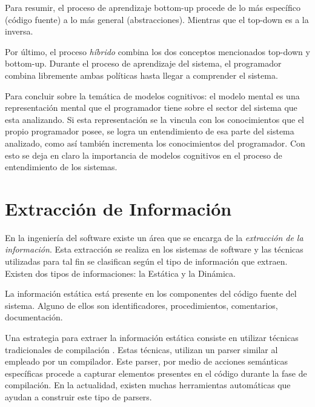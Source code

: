 \documentclass[a4paper,12pt]{report}
\begin{document}

Para resumir, el proceso de aprendizaje bottom-up procede de lo más específico (código fuente) a lo más general (abstracciones). Mientras que el top-down es a la inversa.

Por último, el proceso \textit{híbrido} combina los dos conceptos mencionados top-down y bottom-up. Durante el proceso de aprendizaje del sistema, el programador combina libremente ambas políticas hasta llegar a comprender el sistema.

Para concluir sobre la temática de modelos cognitivos: el modelo mental es una representación mental que el programador tiene sobre el sector del sistema que esta analizando. Si esta representación se la vincula con los conocimientos que el propio programador posee, se logra un entendimiento de esa parte del sistema analizado, como así también incrementa los conocimientos del programador. Con esto se deja en claro la importancia de modelos cognitivos en el proceso de entendimiento de los sistemas.%

\section{Extracción de Información}

En la ingeniería del software existe un área que se encarga de la \textit{extracción de la información}. Esta extracción se realiza en los sistemas de software y las técnicas utilizadas para tal fin se clasifican según el tipo de información que extraen. Existen dos tipos de informaciones: la Estática y la Dinámica.

La información estática está presente en los componentes del código fuente del sistema. Alguno de ellos son identificadores, procedimientos, comentarios, documentación.

Una estrategia para extraer la información estática consiste en utilizar técnicas tradicionales de compilación \cite{AHUL06}. Estas 
técnicas, utilizan un parser similar al empleado por un compilador. Este parser, por medio de acciones semánticas específicas procede a capturar elementos presentes en el código durante la fase de compilación. En la actualidad, existen muchas herramientas automáticas que ayudan a construir este tipo de parsers.
\end{document}
